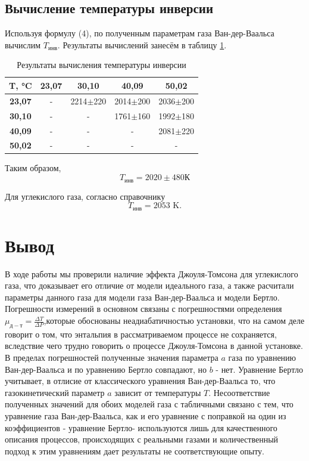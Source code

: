 \documentclass[12pt,a4paper]{article}
\begin{document}
\subsection{Вычисление температуры инверсии}

Используя формулу (4), по полученным параметрам газа Ван-дер-Ваальса вычислим $ T_\text{инв} $. Результаты вычислений занесём в таблицу \ref{tab:temp}.


\begin{table}[h!]
\centering
\begin{tabular}{|c|c|c|c|c|}
\hline
\textbf{T, °C} & \textbf{23,07} & \textbf{30,10} & \textbf{40,09} & \textbf{50,02} \\ \hline
\textbf{23,07} & -              & 2214$\pm$220       & 2014$\pm$200       & 2036$\pm$200       \\ \hline
\textbf{30,10} & -              & -              & 1761$\pm$160       & 1992$\pm$180       \\ \hline
\textbf{40,09} & -              & -              & -              & 2081$\pm$220       \\ \hline
\textbf{50,02} & -              & -              & -              & -              \\ \hline
\end{tabular}
\caption{Результаты вычисления температуры инверсии}
	\label{tab:temp}
\end{table}

Таким образом,
\begin{equation*}
    T_\text{инв} = 2020 \pm 480 К
\end{equation*}

Для углекислого газа, согласно справочнику  \[ T_\text{инв} = 2053 \text{ K}.\]

\section{Вывод}
В ходе работы мы проверили наличие эффекта Джоуля-Томсона для углекислого газа, что доказывает его отличие от модели идеального газа, а также расчитали параметры данного газа для модели газа Ван-дер-Ваальса и модели Бертло. 
Погрешности измерений в основном связаны с погрешностями определения $ \mu_{д-т} = \frac {\Delta T}{\Delta P}$,которые обоснованы неадиабатичностью установки, что на самом деле говорит о том, что энтальпия в рассматриваемом процессе не сохраняется, вследствие чего трудно говорить о процессе Джоуля-Томсона в данной установке. В пределах погрешностей полученные значения параметра $a$ газа по уравнению Ван-дер-Ваальса и по уравнению Бертло совпадают, но  $b$ - нет. Уравнение Бертло учитывает, в отлисие от классического уравнения Ван-дер-Ваальса то, что газокинетический параметр $a$ зависит от температуры $T$. 
Несоответствие полученных значений для обоих моделей газа с табличными связано с тем, что уравнение газа Ван-дер-Ваальса, как и его уравнение с поправкой на один из коэффициентов - уравнение Бертло-  используются лишь для качественного описания процессов, происходящих с реальными газами и количественный подход к этим уравнениям дает результаты не соответствующие опыту. 
\end{document}
